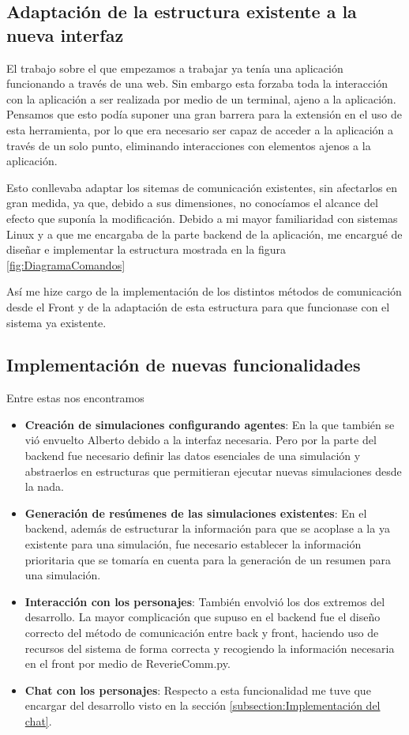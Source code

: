 \subsection*{Adaptación de la estructura existente a la nueva interfaz}

El trabajo sobre el que empezamos a trabajar ya tenía una aplicación funcionando a través de una web. Sin embargo esta forzaba toda la interacción con la aplicación a ser realizada por medio de un terminal, ajeno a la aplicación. Pensamos que esto podía suponer una gran barrera para la extensión en el uso de esta herramienta, por lo que era necesario ser capaz de acceder a la aplicación a través de un solo punto, eliminando interacciones con elementos ajenos a la aplicación.

Esto conllevaba adaptar los sitemas de comunicación existentes, sin afectarlos en gran medida, ya que, debido a sus dimensiones, no conocíamos el alcance del efecto que suponía la modificación. Debido a mi mayor familiaridad con sistemas Linux y a que me encargaba de la parte backend de la aplicación, me encargué de diseñar e implementar la estructura mostrada en la figura \ref{fig:DiagramaComandos}

Así me hize cargo de la implementación de los distintos métodos de comunicación desde el Front y de la adaptación de esta estructura para que funcionase con el sistema ya existente.

\subsection*{Implementación de nuevas funcionalidades}

Entre estas nos encontramos 
\begin{itemize}
    \item \textbf{Creación de simulaciones configurando agentes}: En la que también se vió envuelto Alberto debido a la interfaz necesaria. Pero por la parte del backend fue necesario definir las datos esenciales de una simulación y abstraerlos en estructuras que permitieran ejecutar nuevas simulaciones desde la nada.

    \item \textbf{Generación de resúmenes de las simulaciones existentes}: En el backend, además de estructurar la información para que se acoplase a la ya existente para una simulación, fue necesario establecer la información prioritaria que se tomaría en cuenta para la generación de un resumen para una simulación.

    \item \textbf{Interacción con los personajes}: También envolvió los dos extremos del desarrollo. La mayor complicación que supuso en el backend fue el diseño correcto del método de comunicación entre back y front, haciendo uso de recursos del sistema de forma correcta y recogiendo la información necesaria en el front por medio de ReverieComm.py.

    \item \textbf{Chat con los personajes}: Respecto a esta funcionalidad me tuve que encargar del desarrollo visto en la sección  \ref{subsection:Implementación del chat}.

\end{itemize}

